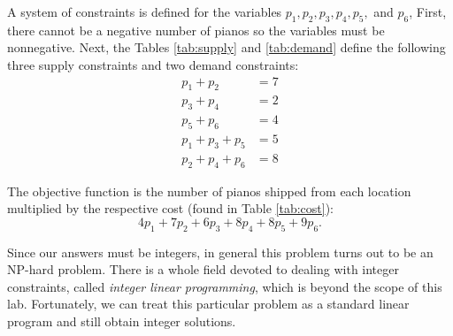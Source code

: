 A system of constraints is defined for the variables $p_1,p_2,p_3,p_4,p_5,$ and $p_6$,
First, there cannot be a negative number of pianos so the variables must be nonnegative.
Next, the Tables \ref{tab:supply} and \ref{tab:demand} define the following three supply constraints and two demand constraints:
\begin{align*}
p_1 + p_2  &= 7\\
p_3 + p_4  &= 2\\
p_5 + p_6  &= 4\\
p_1 + p_3 + p_5 &= 5\\
p_2 + p_4 + p_6 &= 8
\end{align*}

The objective function is the number of pianos shipped from each location multiplied by the respective cost (found in Table \ref{tab:cost}):
\[
4p_1 + 7p_2 + 6p_3 + 8p_4 + 8p_5 + 9p_6.
\]

\begin{info}
Since our answers must be integers, in general this problem turns out to be an NP-hard problem.
There is a whole field devoted to dealing with integer constraints, called \emph{integer linear programming}, which is beyond the scope of this lab.
Fortunately, we can treat this particular problem as a standard linear program and still obtain integer solutions.
\end{info}

